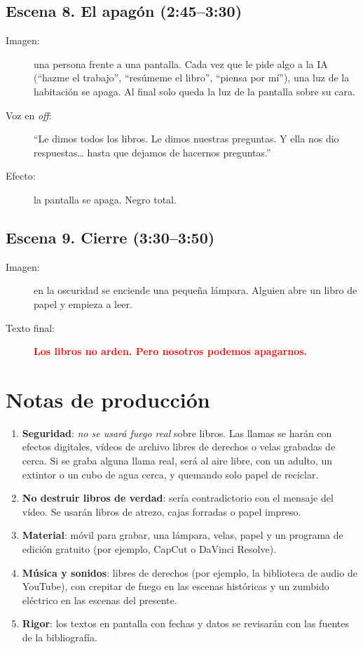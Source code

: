\subsection*{Escena 8. El apagón (2:45--3:30)}
\begin{description}
  \item[Imagen:] una persona frente a una pantalla. Cada vez que le pide algo a
        la IA (``hazme el trabajo'', ``resúmeme el libro'', ``piensa por mí''),
        una luz de la habitación se apaga. Al final solo queda la luz de la
        pantalla sobre su cara.
  \item[Voz en \textit{off}:] ``Le dimos todos los libros. Le dimos nuestras
        preguntas. Y ella nos dio respuestas\ldots{} hasta que dejamos de hacernos
        preguntas.''
  \item[Efecto:] la pantalla se apaga. Negro total.
\end{description}

\subsection*{Escena 9. Cierre (3:30--3:50)}
\begin{description}
  \item[Imagen:] en la oscuridad se enciende una pequeña lámpara. Alguien abre un
        libro de papel y empieza a leer.
  \item[Texto final:] \textcolor{red}{\textbf{Los libros no arden. Pero nosotros
        podemos apagarnos.}}
\end{description}

\section{Notas de producción}

\begin{enumerate}
  \item \textbf{Seguridad}: \emph{no se usará fuego real} sobre libros. Las
        llamas se harán con efectos digitales, vídeos de archivo libres de
        derechos o velas grabadas de cerca. Si se graba alguna llama real, será
        al aire libre, con un adulto, un extintor o un cubo de agua cerca, y
        quemando solo papel de reciclar.
  \item \textbf{No destruir libros de verdad}: sería contradictorio con el mensaje
        del vídeo. Se usarán libros de atrezo, cajas forradas o papel impreso.
  \item \textbf{Material}: móvil para grabar, una lámpara, velas, papel y un
        programa de edición gratuito (por ejemplo, CapCut o DaVinci Resolve).
  \item \textbf{Música y sonidos}: libres de derechos (por ejemplo, la biblioteca
        de audio de YouTube), con crepitar de fuego en las escenas históricas y un
        zumbido eléctrico en las escenas del presente.
  \item \textbf{Rigor}: los textos en pantalla con fechas y datos se revisarán con
        las fuentes de la bibliografía.
\end{enumerate}
